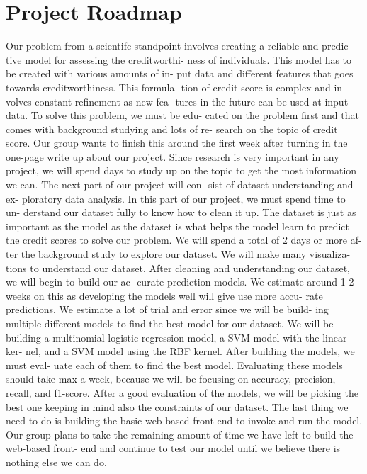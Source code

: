 \documentclass[conference, 11pt]{IEEEtran}
\begin{document}
\section{Project Roadmap}
Our problem from a scientifc standpoint
involves creating a reliable and predic-
tive model for assessing the creditworthi-
ness of individuals. This model has to
be created with various amounts of in-
put data and different features that goes
towards creditworthiness. This formula-
tion of credit score is complex and in-
volves constant refinement as new fea-
tures in the future can be used at input
data.
\vspace{5mm}\newline
To solve this problem, we must be edu-
cated on the problem first and that comes
with background studying and lots of re-
search on the topic of credit score. Our
group wants to finish this around the first
week after turning in the one-page write
up about our project. Since research is
very important in any project, we will
spend days to study up on the topic to
get the most information we can.
The next part of our project will con-
sist of dataset understanding and ex-
ploratory data analysis. In this part of
our project, we must spend time to un-
derstand our dataset fully to know how
to clean it up. The dataset is just as
important as the model as the dataset is
what helps the model learn to predict the
credit scores to solve our problem. We
will spend a total of 2 days or more af-
ter the background study to explore our
dataset. We will make many visualiza-
tions to understand our dataset.
After cleaning and understanding our
dataset, we will begin to build our ac-
curate prediction models. We estimate
around 1-2 weeks on this as developing
the models well will give use more accu-
rate predictions. We estimate a lot of
trial and error since we will be build-
ing multiple different models to find the
best model for our dataset. We will be
building a multinomial logistic regression
model, a SVM model with the linear ker-
nel, and a SVM model using the RBF
kernel.
\vspace{5mm}\newline
After building the models, we must eval-
uate each of them to find the best model.
Evaluating these models should take max
a week, because we will be focusing on
accuracy, precision, recall, and f1-score.
After a good evaluation of the models,
we will be picking the best one keeping in
mind also the constraints of our dataset.
The last thing we need to do is building
the basic web-based front-end to invoke
and run the model. Our group plans to
take the remaining amount of time we
have left to build the web-based front-
end and continue to test our model until
we believe there is nothing else we can
do.
\end{document}

